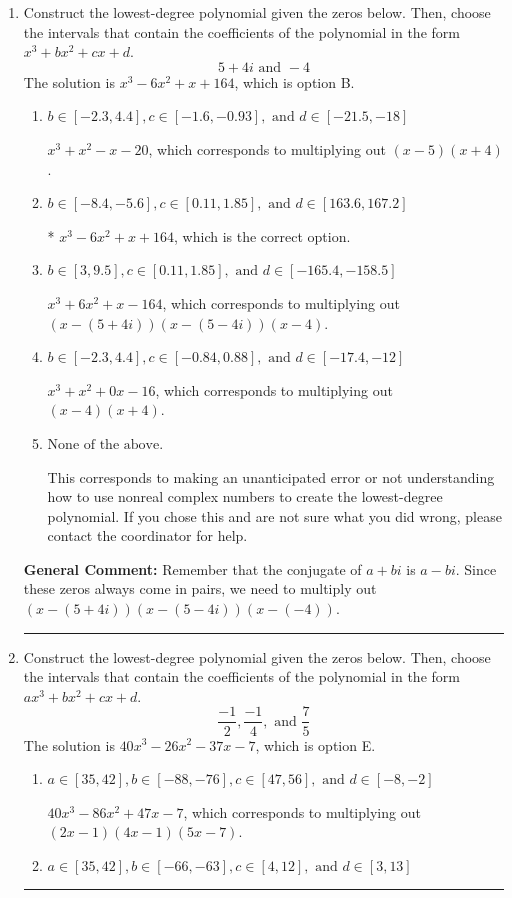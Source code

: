 \documentclass{extbook}[14pt]
\newcommand{\litem}[1]{\item #1

\rule{\textwidth}{0.4pt}}
\begin{document}
\begin{enumerate}\litem{
Construct the lowest-degree polynomial given the zeros below. Then, choose the intervals that contain the coefficients of the polynomial in the form $x^3+bx^2+cx+d$.
\[ 5 + 4 i \text{ and } -4 \]The solution is \( x^{3} -6 x^{2} +x + 164 \), which is option B.\begin{enumerate}[label=\Alph*.]
\item \( b \in [-2.3, 4.4], c \in [-1.6, -0.93], \text{ and } d \in [-21.5, -18] \)

$x^{3} + x^{2} -x -20$, which corresponds to multiplying out $(x -5)(x + 4)$.
\item \( b \in [-8.4, -5.6], c \in [0.11, 1.85], \text{ and } d \in [163.6, 167.2] \)

* $x^{3} -6 x^{2} +x + 164$, which is the correct option.
\item \( b \in [3, 9.5], c \in [0.11, 1.85], \text{ and } d \in [-165.4, -158.5] \)

$x^{3} +6 x^{2} +x -164$, which corresponds to multiplying out $(x-(5 + 4 i))(x-(5 - 4 i))(x -4)$.
\item \( b \in [-2.3, 4.4], c \in [-0.84, 0.88], \text{ and } d \in [-17.4, -12] \)

$x^{3} + x^{2} +0 x -16$, which corresponds to multiplying out $(x -4)(x + 4)$.
\item \( \text{None of the above.} \)

This corresponds to making an unanticipated error or not understanding how to use nonreal complex numbers to create the lowest-degree polynomial. If you chose this and are not sure what you did wrong, please contact the coordinator for help.
\end{enumerate}

\textbf{General Comment:} Remember that the conjugate of $a+bi$ is $a-bi$. Since these zeros always come in pairs, we need to multiply out $(x-(5 + 4 i))(x-(5 - 4 i))(x-(-4))$.
}
\litem{
Construct the lowest-degree polynomial given the zeros below. Then, choose the intervals that contain the coefficients of the polynomial in the form $ax^3+bx^2+cx+d$.
\[ \frac{-1}{2}, \frac{-1}{4}, \text{ and } \frac{7}{5} \]The solution is \( 40x^{3} -26 x^{2} -37 x -7 \), which is option E.\begin{enumerate}[label=\Alph*.]
\item \( a \in [35, 42], b \in [-88, -76], c \in [47, 56], \text{ and } d \in [-8, -2] \)

$40x^{3} -86 x^{2} +47 x -7$, which corresponds to multiplying out $(2x -1)(4x -1)(5x -7)$.
\item \( a \in [35, 42], b \in [-66, -63], c \in [4, 12], \text{ and } d \in [3, 13] \)


\end{enumerate}}
\end{enumerate}
\end{document}
